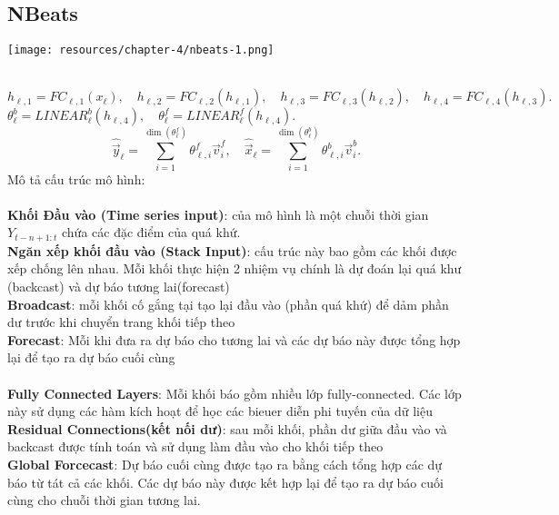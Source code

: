 \subsection{NBeats}
\begin{minipage}{0.45\textwidth}
\centering
\texttt{[image: resources/chapter-4/nbeats-1.png]}
\end{minipage}
\\
\({h}_{\ell,1} = FC_{\ell,1}({x}_{\ell}), \quad {h}_{\ell,2} = FC_{\ell,2}({h}_{\ell,1}), \quad {h}_{\ell,3} = FC_{\ell,3}({h}_{\ell,2}), \quad {h}_{\ell,4} = FC_{\ell,4}({h}_{\ell,3}).\) \\
\(\theta^b_{\ell} = LINEAR_{\ell}^{b}({h}_{\ell,4}), \quad \theta^f_{\ell} = LINEAR_{\ell}^{f}({h}_{\ell,4}).\) \\

\[\widehat{\vec{y}}_{\ell} = \sum_{i=1}^{\dim(\theta^f_{\ell})} \theta^f_{\ell,i} \vec{v}^f_{i}, \quad  \widehat{\vec{x}}_{\ell} = \sum_{i=1}^{\dim(\theta^b_{\ell})} \theta^b_{\ell,i} \vec{v}^b_{i}.
\]
Mô tả cấu trúc mô hình: \\
\\
\textbf{Khối Đầu vào (Time series input)}: của mô hình là một chuỗi thời gian \(Y_{t-n+1:t}\) chứa các đặc điểm của quá khứ.\\
\textbf{Ngăn xếp khối đầu vào (Stack Input)}: cấu trúc này bao gồm các khối được xếp chống lên nhau. Mỗi khối thực hiện 2 nhiệm vụ chính là dự đoán lại quá khư (backcast) và dự báo tương lai(forecast)\\
\textbf{Broadcast}: mỗi khối cố  gắng tại tạo lại đầu vào (phần quá khứ) để dảm phần dư trước khi chuyển trang khối tiếp theo\\
\textbf{Forecast}: Mỗi khi đưa ra dự báo cho tương lai và các dự báo này được tổng hợp lại để tạo ra dự báo cuối cùng\\
\\
\textbf{Fully Connected Layers}: Mỗi khối báo gồm nhiều lớp fully-connected. Các lớp này sử dụng các hàm kích hoạt để học các bieuer diễn phi tuyến của dữ liệu\\
\textbf{Residual Connections(kết nối dư)}: sau mỗi khối, phần dư giữa đầu vào và backcast được tính toán và sử dụng làm đầu vào cho khối tiếp theo\\
\textbf{Global Forcecast}: Dự báo cuối cùng được tạo ra bằng cách tổng hợp các dự báo từ tát cả các khối. Các dự báo này được kết hợp lại để tạo ra dự báo cuối cùng cho chuỗi thời gian tương lai.\\

